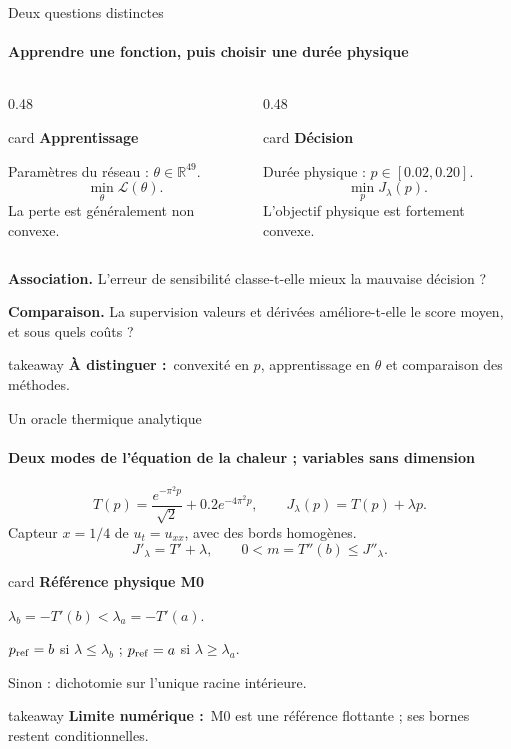 \documentclass[aspectratio=169,11pt]{beamer}
\newcommand{\sectionlabel}{Question}
\newcommand{\card}[2]{%
  \begin{beamercolorbox}[wd=\linewidth,sep=7pt]{card}
  {\color{teal}\bfseries #1}\par\vspace{4pt}#2
  \end{beamercolorbox}}
\newcommand{\takeaway}[2]{%
  \begin{beamercolorbox}[wd=\linewidth,sep=7pt]{takeaway}
  \small\textbf{#1}\ #2
  \end{beamercolorbox}}
\begin{document}
\renewcommand{\sectionlabel}{01 / Question}
\begin{frame}[t]{Deux questions distinctes}
\framesubtitle{Apprendre une fonction, puis choisir une durée physique}
\begin{columns}[T,onlytextwidth]
\begin{column}{0.48\textwidth}
\card{Apprentissage}{%
Paramètres du réseau : $\theta\in\mathbb R^{49}$.
\[\min_\theta\mathcal L(\theta).\]
La perte est généralement non convexe.}
\end{column}
\begin{column}{0.48\textwidth}
\card{Décision}{%
Durée physique : $p\in[0.02,0.20]$.
\[\min_p J_\lambda(p).\]
L'objectif physique est fortement convexe.}
\end{column}
\end{columns}
\vspace{0.35cm}
\textbf{Association.} L'erreur de sensibilité classe-t-elle mieux la mauvaise décision ?\par\vspace{0.18cm}
\textbf{Comparaison.} La supervision valeurs et dérivées améliore-t-elle le score moyen, et sous quels coûts ?
\vfill
\takeaway{À distinguer :}{convexité en $p$, apprentissage en $\theta$ et comparaison des méthodes.}
\end{frame}

\renewcommand{\sectionlabel}{02 / Modèle physique}
\begin{frame}[t]{Un oracle thermique analytique}
\framesubtitle{Deux modes de l'équation de la chaleur ; variables sans dimension}
\[
T(p)=\frac{e^{-\pi^2p}}{\sqrt2}+0.2e^{-4\pi^2p},
\qquad J_\lambda(p)=T(p)+\lambda p.
\]
Capteur $x=1/4$ de $u_t=u_{xx}$, avec des bords homogènes.
\[J'_\lambda=T'+\lambda,\qquad 0<m=T''(b)\leq J''_\lambda.\]
\card{Référence physique M0}{%
$\lambda_b=-T'(b)<\lambda_a=-T'(a)$.\par\vspace{3pt}
$p_{\rm ref}=b$ si $\lambda\leq\lambda_b$ ; $p_{\rm ref}=a$ si $\lambda\geq\lambda_a$.\par\vspace{3pt}
Sinon : dichotomie sur l'unique racine intérieure.}
\vfill
\takeaway{Limite numérique :}{M0 est une référence flottante ; ses bornes restent conditionnelles.}
\end{frame}
\end{document}
